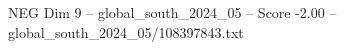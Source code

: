 \begin{textsample}{NEG Dim 9 – global\_south\_2024\_05 – Score -2.00 – global\_south\_2024\_05/108397843.txt}
\end{textsample}
